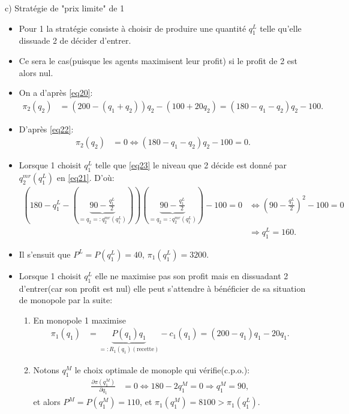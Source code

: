 \begin{frame}[allowframebreaks]{c) Stratégie de "prix limite" de 1}
    \begin{itemize}
        \item Pour 1 la stratégie consiste à choisir de produire une quantité $q_1^L$ telle qu'elle dissuade 2 
        de décider d'entrer. 
        \item Ce sera le cas(puisque les agents maximisent leur profit) si le profit de 2 est alors nul.
        \item On a d'après \eqref{eq20}:
        \begin{align}
            \pi_2(q_2) &= (200 - (q_1 + q_2))q_2 - (100 + 20q_2) = (180 - q_1-q_2)q_2 - 100.
         \label{eq22}
        \end{align}
        \item D'après \eqref{eq22}:
        \begin{align}
            \pi_2(q_2) &= 0 \Leftrightarrow  (180 - q_1-q_2)q_2 - 100 = 0.
            \label{eq23}
        \end{align}
        \item Lorsque 1 choisit $q_1^L$ telle que \eqref{eq23} le niveau 
        que 2 décide est donné par $q_2^{mr}(q_1^L)$ en \eqref{eq21}. D'où:
        \begin{align*}
            \left(180-q_1^L - \left(\underbrace{90 - \frac{q_1^L}{2}}_{=q_2=:q_2^{mr}(q_1^L)}\right)\right)\left(
                \underbrace{90 - \frac{q_1^L}{2}}_{=q_2=:q_2^{mr}(q_1^L)}\right) - 100 = 0& \Leftrightarrow 
                \left(90-\frac{q_1^L}{2}\right)^2 -100=0\\
                &\Rightarrow q_1^L = 160.
        \end{align*}
        \item Il s'ensuit que $P^L = P(q_1^L) = 40$, $\pi_1(q_1^L) = 3200$.
        \item Lorsque 1 choisit $q_1^L$ elle ne maximise pas son profit 
        mais en dissuadant 2 d'entrer(car son profit est nul) elle peut 
        s'attendre à bénéficier de sa situation de monopole par la suite:
        \begin{enumerate}[-]
            \item En monopole 1 maximise
            \begin{align*}
                \pi_1(q_1) &= \underbrace{P(q_1)q_1}_{=:R_1(q_1)(\text{recette})} -c_1(q_1) = (200-q_1)q_1 - 20q_1.
            \end{align*}
            \item Notons $q_1^M$ le choix optimale de monople qui vérifie(c.p.o.): 
            \begin{align*}
                \frac{\partial \pi(q_1^M)}{\partial q_1} &= 0 \Leftrightarrow 180-2q_1^M = 0\Rightarrow q_1^M = 90,
            \end{align*}
            et alors $P^M=P(q_1^M) = 110$, et $\pi_1(q_1^M) = 8100 > \pi_1(q_1^L)$.
        \end{enumerate}
    \end{itemize}
    \end{frame}
